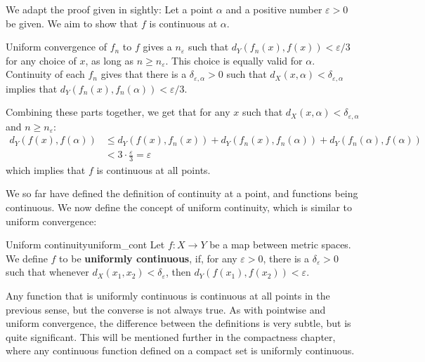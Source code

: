 \begin{bproof}{}{}
We adapt the proof given in \cite{munkres} sightly: Let a point $\alpha$ and a positive number $\varepsilon >0$ be given. We aim to show that $f$ is continuous at $\alpha$.

Uniform convergence of $f_{n}$ to $f$ gives a $n_{\varepsilon}$ such that $d_{Y}(f_{n}(x),f(x)) < \varepsilon/3$ for any choice of $x$, as long as $n\geq n_{\varepsilon}$. This choice is equally valid for $\alpha$. Continuity of each $f_{n}$ gives that there is a $\delta_{\varepsilon,\alpha}>0$ such that $d_{X}(x, \alpha) < \delta_{\varepsilon,\alpha}$ implies that $d_{Y}(f_{n}(x), f_{n}(\alpha))<\varepsilon/3$.

Combining these parts together, we get that for any $x$ such that $d_{X}(x,\alpha)< \delta_{\varepsilon,\alpha}$ and $n\geq n_{\varepsilon}$:
\begin{equation}
    \begin{split}
        d_{Y}(f(x), f(\alpha)) &\leq d_{Y}(f(x),f_{n}(x)) + d_{Y}(f_{n}(x),f_{n}(\alpha)) + d_{Y}(f_{n}(\alpha),f(\alpha)) \\
        &< 3\cdot \frac{\varepsilon}{3} = \varepsilon
    \end{split}
\end{equation}
which implies that $f$ is continuous at all points.
\eop
\end{bproof}



We so far have defined the definition of continuity at a point, and functions being continuous. We now define the concept of uniform continuity, which is similar to uniform convergence:
\begin{bdefin}{Uniform continuity}{uniform_cont}
Let $f : X \to Y$ be a map between metric spaces. We define $f$ to be \textbf{uniformly continuous}, if, for any $\varepsilon>0$, there is a $\delta_{\varepsilon}>0$ such that whenever \mbox{$d_{X}(x_{1},x_{2})<\delta_{\varepsilon}$,} then \mbox{$d_{Y}(f(x_{1}),f(x_{2})) < \varepsilon$.}
\end{bdefin}

Any function that is uniformly continuous is continuous at all points in the previous sense, but the converse is not always true. As with pointwise and uniform convergence, the difference between the definitions is very subtle, but is quite significant. This will be mentioned further in the compactness chapter, where any continuous function defined on a compact set is uniformly continuous.



